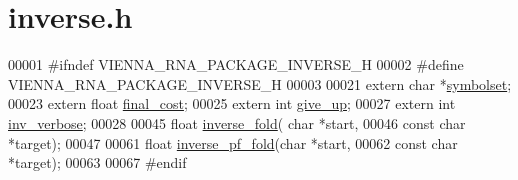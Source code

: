 \hypertarget{inverse_8h_source}{\section{inverse.\+h}
\label{inverse_8h_source}
}

\begin{DoxyCode}
00001 \textcolor{preprocessor}{#ifndef VIENNA\_RNA\_PACKAGE\_INVERSE\_H}
00002 \textcolor{preprocessor}{#define VIENNA\_RNA\_PACKAGE\_INVERSE\_H}
00003 
00021 \textcolor{keyword}{extern} \textcolor{keywordtype}{char} *\hyperlink{group__inverse__fold_ga8f791e7740a5a28b9f6fafb4e60301d9}{symbolset};
00023 \textcolor{keyword}{extern}  \textcolor{keywordtype}{float} \hyperlink{group__inverse__fold_ga7f17d3b169af048d32bb185039a9c09c}{final\_cost};
00025 \textcolor{keyword}{extern}  \textcolor{keywordtype}{int}   \hyperlink{group__inverse__fold_ga7ec4ba51f86e1717a1e174264e4a75ce}{give\_up};
00027 \textcolor{keyword}{extern}  \textcolor{keywordtype}{int}   \hyperlink{group__inverse__fold_gafcfc65fba01b9cca5946726ed9057a63}{inv\_verbose};
00028 
00045 \textcolor{keywordtype}{float} \hyperlink{group__inverse__fold_ga7af026de55d4babad879f2c92559cbbc}{inverse\_fold}( \textcolor{keywordtype}{char} *start,
00046                     \textcolor{keyword}{const} \textcolor{keywordtype}{char} *target);
00047 
00061 \textcolor{keywordtype}{float} \hyperlink{group__inverse__fold_gaeef52ecbf2a2450ad585a344f9826806}{inverse\_pf\_fold}(\textcolor{keywordtype}{char} *start,
00062                       \textcolor{keyword}{const} \textcolor{keywordtype}{char} *target);
00063 
00067 \textcolor{preprocessor}{#endif}
\end{DoxyCode}
